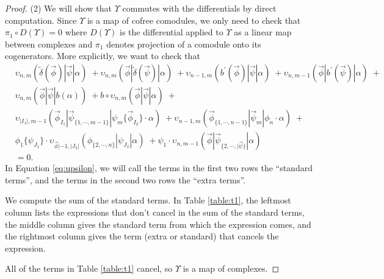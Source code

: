\begin{proof}
(2) We will show that $\Upsilon$ commutes with 
the differentials by direct computation. Since 
$\Upsilon$ is a map of cofree comodules, we only 
need to check that $\pi_1 \circ D(\Upsilon) = 0$ 
where $D(\Upsilon)$ is the differential applied 
to $\Upsilon$ as a linear map between complexes 
and $\pi_1$ denotes projection of a comodule 
onto its cogenerators. More explicitly, we want 
to check that
\begin{equation} \label{eq:upsilon}
\begin{aligned}
&\upsilon_{n, m} ( \tilde{\delta}(\vec{\phi}) | \vec{\psi} | \alpha ) \; + 
\upsilon_{n, m} ( \vec{\phi} | \tilde{\delta}(\vec{\psi}) | \alpha ) \; + 
\upsilon_{n-1, m} ( b^\prime(\vec{\phi}) | \vec{\psi} | \alpha ) \; + 
\upsilon_{n, m-1} ( \vec{\phi} | b^\prime(\vec{\psi}) | \alpha ) \; + \\
&\upsilon_{n, m} ( \vec{\phi} | \vec{\psi} | b(\alpha) ) \; + 
b \circ \upsilon_{n, m} ( \vec{\phi} | \vec{\psi} | \alpha ) \; + \\
&\upsilon_{|I_1|, m-1}(\vec{\phi}_{I_1} | \vec{\psi}_{\{1,\cdots, m-1\}} | \psi_{m} \{\vec{\phi}_{I_2}\} \cdot \alpha ) \; + 
\upsilon_{n-1, m}(\vec{\phi}_{\{1,\cdots, n-1\}} |\vec{\psi}_{m} | \phi_{n}\cdot \alpha) \; + \\
&\phi_1 \{ \psi_{J_1}\}\cdot \upsilon_{\vec{\phi}|-1, |J_2|}(\phi_{\{2,\cdots , n\}} | \psi_{J_2} | \alpha ) \; + 
\psi_1\cdot \upsilon_{n,m-1} ( \vec{\phi} | \vec{\psi}_{\{2,\cdots, |\vec{\psi}\}} | \alpha) \\ 
&= 0.
\end{aligned}
\end{equation}
In Equation \ref{eq:upsilon}, we will call the 
terms in the first two rows the ``standard terms'', 
and the terms in the second two rows the 
``extra terms''.

We compute the sum of the standard terms. 
In Table \ref{table:t1}, the leftmost column 
lists the expressions that don't cancel in 
the sum of the standard terms, the middle 
column gives the standard term from which 
the expression comes, and the rightmost 
column gives the term (extra or standard) 
that cancels the expression. 

All of the terms in Table \ref{table:t1} 
cancel, so $\Upsilon$ is a map of complexes.
\end{proof}
%
